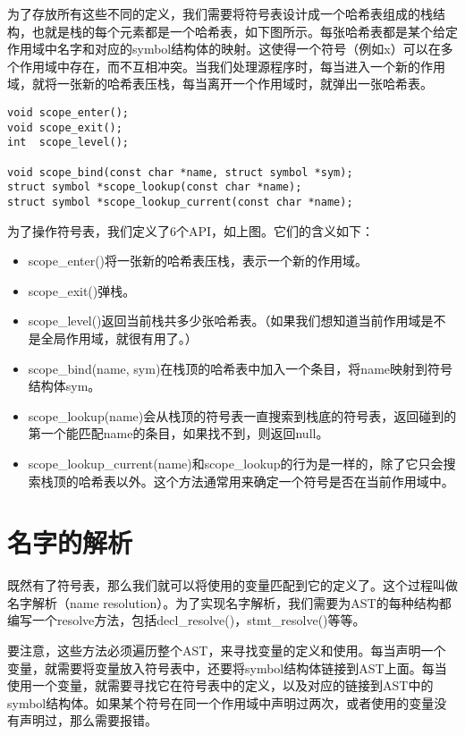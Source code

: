 \documentclass[cn,11pt,chinese]{elegantbook}
\begin{document}
为了存放所有这些不同的定义，我们需要将符号表设计成一个哈希表组成的栈结构，也就是栈的每个元素都是一个哈希表，如下图所示。每张哈希表都是某个给定作用域中名字和对应的symbol结构体的映射。这使得一个符号（例如x）可以在多个作用域中存在，而不互相冲突。当我们处理源程序时，每当进入一个新的作用域，就将一张新的哈希表压栈，每当离开一个作用域时，就弹出一张哈希表。

\begin{verbatim}
void scope_enter();
void scope_exit();
int  scope_level();

void scope_bind(const char *name, struct symbol *sym);
struct symbol *scope_lookup(const char *name);
struct symbol *scope_lookup_current(const char *name);
\end{verbatim}

为了操作符号表，我们定义了6个API，如上图。它们的含义如下：

\begin{itemize}
  \item scope\_enter()将一张新的哈希表压栈，表示一个新的作用域。
  \item scope\_exit()弹栈。
  \item scope\_level()返回当前栈共多少张哈希表。（如果我们想知道当前作用域是不是全局作用域，就很有用了。）
  \item scope\_bind(name, sym)在栈顶的哈希表中加入一个条目，将name映射到符号结构体sym。
  \item scope\_lookup(name)会从栈顶的符号表一直搜索到栈底的符号表，返回碰到的第一个能匹配name的条目，如果找不到，则返回null。
  \item scope\_lookup\_current(name)和scope\_lookup的行为是一样的，除了它只会搜索栈顶的哈希表以外。这个方法通常用来确定一个符号是否在当前作用域中。
\end{itemize}

\section{名字的解析}

既然有了符号表，那么我们就可以将使用的变量匹配到它的定义了。这个过程叫做名字解析（name resolution）。为了实现名字解析，我们需要为AST的每种结构都编写一个resolve方法，包括decl\_resolve()，stmt\_resolve()等等。

要注意，这些方法必须遍历整个AST，来寻找变量的定义和使用。每当声明一个变量，就需要将变量放入符号表中，还要将symbol结构体链接到AST上面。每当使用一个变量，就需要寻找它在符号表中的定义，以及对应的链接到AST中的symbol结构体。如果某个符号在同一个作用域中声明过两次，或者使用的变量没有声明过，那么需要报错。
\end{document}
